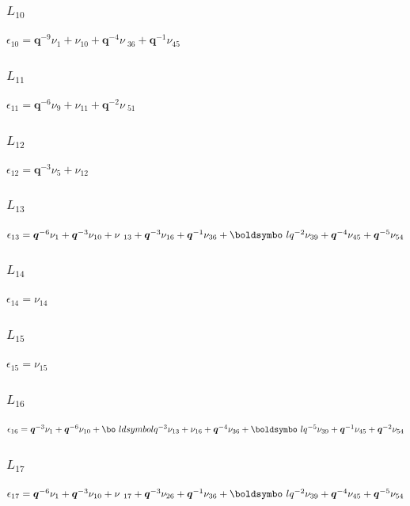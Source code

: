 \subsubsection*{$L_{10}$}
$
\epsilon_{10} = \boldsymbol{q}^{-9}\nu_{1} + \nu_{10} + \boldsymbol{q}^{-4}\nu\
_{36} + \boldsymbol{q}^{-1}\nu_{45}
$

\subsubsection*{$L_{11}$}
$
\epsilon_{11} = \boldsymbol{q}^{-6}\nu_{9} + \nu_{11} + \boldsymbol{q}^{-2}\nu\
_{51}
$

\subsubsection*{$L_{12}$}
$
\epsilon_{12} = \boldsymbol{q}^{-3}\nu_{5} + \nu_{12}
$

\subsubsection*{$L_{13}$}
$
\epsilon_{13} = \boldsymbol{q}^{-6}\nu_{1} + \boldsymbol{q}^{-3}\nu_{10} + \nu\
_{13} + \boldsymbol{q}^{-3}\nu_{16} + \boldsymbol{q}^{-1}\nu_{36} + \boldsymbo\
l{q}^{-2}\nu_{39} + \boldsymbol{q}^{-4}\nu_{45} + \boldsymbol{q}^{-5}\nu_{54}
$

\subsubsection*{$L_{14}$}
$
\epsilon_{14} = \nu_{14}
$

\subsubsection*{$L_{15}$}
$
\epsilon_{15} = \nu_{15}
$

\subsubsection*{$L_{16}$}
$
\epsilon_{16} = \boldsymbol{q}^{-3}\nu_{1} + \boldsymbol{q}^{-6}\nu_{10} + \bo\
ldsymbol{q}^{-3}\nu_{13} + \nu_{16} + \boldsymbol{q}^{-4}\nu_{36} + \boldsymbo\
l{q}^{-5}\nu_{39} + \boldsymbol{q}^{-1}\nu_{45} + \boldsymbol{q}^{-2}\nu_{54}
$

\subsubsection*{$L_{17}$}
$
\epsilon_{17} = \boldsymbol{q}^{-6}\nu_{1} + \boldsymbol{q}^{-3}\nu_{10} + \nu\
_{17} + \boldsymbol{q}^{-3}\nu_{26} + \boldsymbol{q}^{-1}\nu_{36} + \boldsymbo\
l{q}^{-2}\nu_{39} + \boldsymbol{q}^{-4}\nu_{45} + \boldsymbol{q}^{-5}\nu_{54}
$

